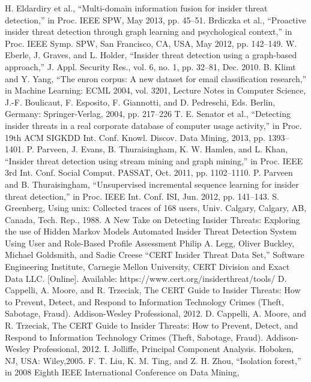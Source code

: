 \documentclass[conference]{IEEEtran}
\begin{document}
\begin{thebibliography}{00}
 H. Eldardiry et al., “Multi-domain information fusion for insider threat detection,” in Proc. IEEE SPW, May 2013, pp. 45–51.
 Brdiczka et al., “Proactive insider threat detection through graph learning and psychological context,” in Proc. IEEE Symp. SPW, San Francisco, CA, USA, May 2012, pp. 142–149.
W. Eberle, J. Graves, and L. Holder, “Insider threat detection using a graph-based approach,” J. Appl. Security Res., vol. 6, no. 1, pp. 32–81, Dec. 2010.
B. Klimt and Y. Yang, “The enron corpus: A new dataset for email classification research,” in Machine Learning: ECML 2004, vol. 3201, Lecture Notes in Computer Science, J.-F. Boulicaut, F. Esposito, F. Giannotti, and D. Pedreschi, Eds. Berlin, Germany: Springer-Verlag, 2004, pp. 217–226
T. E. Senator et al., “Detecting insider threats in a real corporate database of computer usage activity,” in Proc. 19th ACM SIGKDD Int. Conf. Knowl. Discov. Data Mining, 2013, pp. 1393–1401.
P. Parveen, J. Evans, B. Thuraisingham, K. W. Hamlen, and L. Khan, “Insider threat detection using stream mining and graph mining,” in Proc. IEEE 3rd Int. Conf. Social Comput. PASSAT, Oct. 2011, pp. 1102–1110.
P. Parveen and B. Thuraisingham, “Unsupervised incremental sequence learning for insider threat detection,” in Proc. IEEE Int. Conf. ISI, Jun. 2012, pp. 141–143.
S. Greenberg, Using unix: Collected traces of 168 users, Univ. Calgary, Calgary, AB, Canada, Tech. Rep., 1988.
A New Take on Detecting Insider Threats: Exploring the use of Hidden Markov Models
Automated Insider Threat Detection System Using User and Role-Based Profile Assessment Philip A. Legg, Oliver Buckley, Michael Goldsmith, and Sadie Creese
“CERT Insider Threat Data Set,” Software Engineering Institute, Carnegie Mellon University, CERT Division and Exact
Data LLC. [Online]. Available: https://www.cert.org/insiderthreat/tools/
D. Cappelli, A. Moore, and R. Trzeciak, The CERT Guide to Insider Threats: How to Prevent, Detect, and Respond
to Information Technology Crimes (Theft, Sabotage, Fraud). Addison-Wesley Professional, 2012.
 D. Cappelli, A. Moore, and R. Trzeciak, The CERT Guide to Insider Threats: How to Prevent, Detect, and Respond
to Information Technology Crimes (Theft, Sabotage, Fraud). Addison-Wesley Professional, 2012.
I. Jolliffe, Principal Component Analysis. Hoboken, NJ, USA: Wiley,2005.
F. T. Liu, K. M. Ting, and Z. H. Zhou, “Isolation forest,” in 2008 Eighth IEEE International Conference on Data Mining,

\end{thebibliography}
\end{document}
